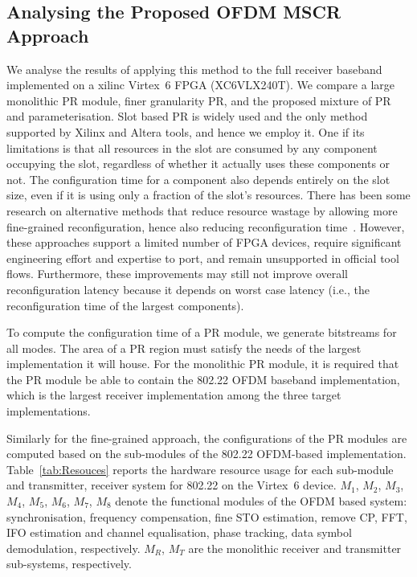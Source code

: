 \subsection{Analysing the Proposed OFDM MSCR Approach}
We analyse the results of applying this method to the full receiver baseband  implemented on a xilinc Virtex~6 FPGA (XC6VLX240T).
We compare a large monolithic PR module, finer granularity PR, and the proposed mixture of PR and parameterisation.
Slot based PR is widely used and the only method supported by Xilinx and Altera tools, and hence we employ it.
One if its limitations is that all resources in the slot are consumed by any component occupying the slot, regardless of whether it actually uses these components or not. The configuration time for a component also depends entirely on the slot size, even if it is using only a fraction of the slot's resources.
There has been some research on alternative methods that reduce resource wastage by allowing more fine-grained reconfiguration, hence also reducing reconfiguration time~\cite{Sohanghpurwala2011}.
However, these approaches support a limited number of FPGA devices, require significant engineering effort and expertise to port, and remain unsupported in official tool flows.
Furthermore, these improvements may still not improve overall reconfiguration latency because it depends on worst case latency (i.e., the reconfiguration time of the largest components).


To compute the configuration time of a PR module, we generate bitstreams for all modes.
The area of a PR region must satisfy the needs of the largest implementation it will house.
For the monolithic PR module, it is required that the PR module be able to contain the 802.22 OFDM baseband implementation, which is the largest receiver implementation among the three target implementations.

Similarly for the fine-grained approach, the configurations of the PR modules are computed based on the sub-modules of the 802.22 OFDM-based  implementation.
Table~\ref{tab:Resouces} reports the hardware resource usage for each sub-module and transmitter, receiver system for 802.22 on the Virtex~6 device. $M_1$, $M_2$, $M_3$, $M_4$, $M_5$, $M_6$, $M_7$, $M_8$ denote the functional modules of the OFDM based system: synchronisation, frequency compensation, fine STO estimation, remove CP, FFT, IFO estimation and channel equalisation, phase tracking, data symbol demodulation, respectively. $M_R$, $M_T$ are the monolithic receiver and transmitter sub-systems, respectively.

